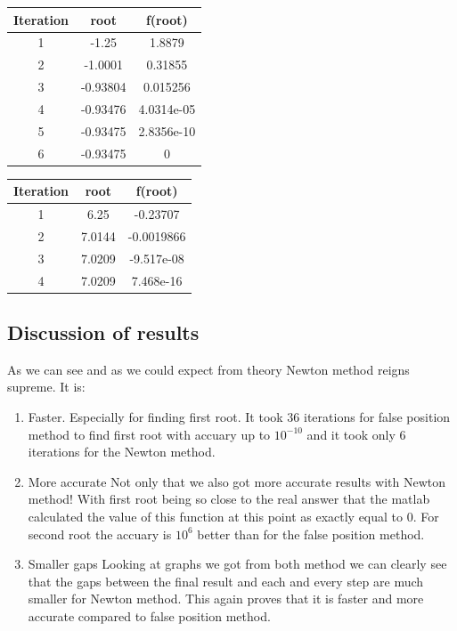 \documentclass[12pt]{report}
\begin{document}
\begin{center}
  \begin{tabular}{| c  c c |}
\hline
Iteration & root         & f(root) \\
\hline
1   &      -1.25   &      1.8879  \\
\hline
2   &    -1.0001   &     0.31855  \\
\hline
3   &   -0.93804   &    0.015256  \\
\hline
4   &   -0.93476   &  4.0314e-05  \\
\hline
5   & -0.93475    & 2.8356e-10  \\
\hline
6   &   -0.93475   &           0  \\
\hline
\hline

\hline
\end{tabular}
\end{center}

\begin{center}
  \begin{tabular}{| c  c c |}
\hline
Iteration & root         & f(root) \\
\hline
1   &     6.25    &   -0.23707  \\
\hline
2    &  7.0144    & -0.0019866 \\
\hline
3     & 7.0209    & -9.517e-08  \\
\hline
4      &7.0209    &  7.468e-16  \\
\hline
\hline

\hline
\end{tabular}
\end{center}

\subsection{Discussion of results}
As we can see and as we could expect from theory Newton method reigns supreme.
It is:
\begin{enumerate}
\item Faster.
Especially for finding first root. It took 36 iterations for false position method to find first root with accuary up to $10^{-10}$ and it took only 6 iterations for the Newton method.
\item More accurate
Not only that we also got more accurate results with Newton method! With first root being so close to the real answer that the matlab calculated the value of this function at this point as exactly equal to 0. For second root the accuary is $10^{6}$ better than for the false position method.
\item Smaller gaps
Looking at graphs we got from both method we can clearly see that the gaps between the final result and each and every step are much smaller for Newton method. This again proves that it is faster and more accurate compared to false position method.
\end{enumerate}
\end{document}
